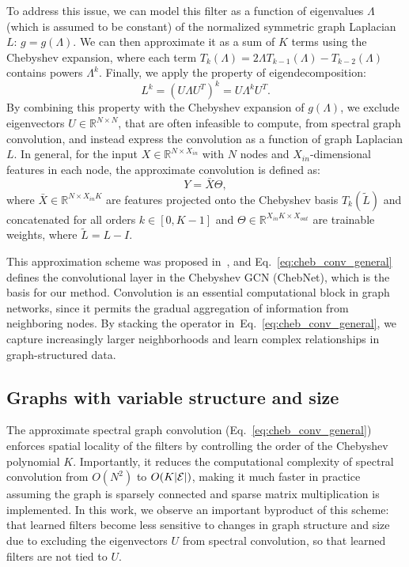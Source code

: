 \documentclass[final,nonatbib]{article} \usepackage{nips_2018}
\begin{document}
	To address this issue, we can model this filter as a function of eigenvalues $\Lambda$ (which is assumed to be constant) of the normalized symmetric graph Laplacian $L$: $g = g(\Lambda)$. We can then approximate it as a sum of $K$ terms using the Chebyshev expansion, where each term $T_k(\Lambda) = 2 \Lambda T_{k-1}(\Lambda) - T_{k-2}(\Lambda)$ contains powers $\Lambda^k$. Finally, we apply the property of eigendecomposition:
	\begin{equation}
	\label{eq:eigen_property_power}
	L^k=(U \Lambda U^T)^k = U \Lambda^k U^T.
	\end{equation}
	By combining this property with the Chebyshev expansion of $g(\Lambda)$, we exclude eigenvectors $U \in \mathbb{R}^{N \times N}$, that are often infeasible to compute, from spectral graph convolution, and instead express the convolution as a function of graph Laplacian $L$.
	In general, for the input $X \in \mathbb{R}^{N \times X_{in}}$ with $N$ nodes and $X_{in}$-dimensional features in each node, the approximate convolution is defined as:
\begin{equation}
	\label{eq:cheb_conv_general}
	Y = \bar{X} \Theta,
	\end{equation}
where $\bar{X} \in \mathbb{R}^{N \times X_{in}K}$ are features projected onto the Chebyshev basis $T_k(\tilde{L})$ and concatenated for all orders $k \in [0, K-1]$ and $\Theta \in \mathbb{R}^{X_{in}K \times X_{out}}$ are trainable weights, where $\tilde{L} = L - I$.

	This approximation scheme was proposed in~\cite{defferrard2016convolutional}, and Eq.~\ref{eq:cheb_conv_general} defines the convolutional layer in the Chebyshev GCN (ChebNet), which is the basis for our method. Convolution is an essential computational block in graph networks, since it permits the gradual aggregation of information from neighboring nodes. By stacking the operator in~Eq.~\ref{eq:cheb_conv_general}, we capture increasingly larger neighborhoods and learn complex relationships in graph-structured data.
\subsection{Graphs with variable structure and size}
	\label{sec:graph_structure_size}
The approximate spectral graph convolution (Eq.~\ref{eq:cheb_conv_general}) enforces spatial locality of the filters by controlling the order of the Chebyshev polynomial $K$. Importantly, it reduces the computational complexity of spectral convolution from $O(N^2)$ to $O(K|\cal{E}|)$, making it much faster in practice assuming the graph is sparsely connected and sparse matrix multiplication is implemented.
	In this work, we observe an important byproduct of this scheme: that learned filters become less sensitive to changes in graph structure and size due to excluding the eigenvectors $U$ from spectral convolution, so that learned filters are not tied to $U$.
\end{document}
